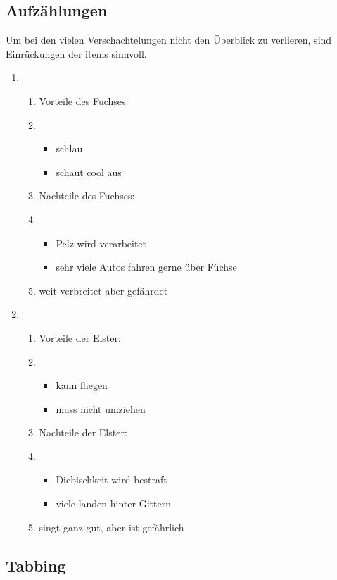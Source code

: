 \documentclass[a4paper, pdftex, ngerman, 11pt]{article}
\begin{document}
\subsection{Aufzählungen}
Um bei den vielen Verschachtelungen nicht den Überblick zu verlieren, sind Einrückungen der items sinnvoll.
\begin{enumerate}
  \item 
  \begin{enumerate}
    \item Vorteile des Fuchses:
    \item
    \begin{itemize}
      \item schlau
      \item schaut cool aus
    \end{itemize}
    \item Nachteile des Fuchses:
    \item
    \begin{itemize}
      \item Pelz wird verarbeitet
      \item sehr viele Autos fahren gerne über Füchse
    \end{itemize}
    \item weit verbreitet aber gefährdet
  \end{enumerate}
  \item
  \begin{enumerate}
    \item Vorteile der Elster:
    \item
    \begin{itemize}
      \item kann fliegen
      \item muss nicht umziehen
    \end{itemize}
    \item Nachteile der Elster:
    \item
    \begin{itemize}
      \item Diebischkeit wird bestraft
      \item viele landen hinter Gittern
    \end{itemize}
      \item singt ganz gut, aber ist gefährlich
  \end{enumerate}
\end{enumerate}

\subsection{Tabbing}
\end{document}
